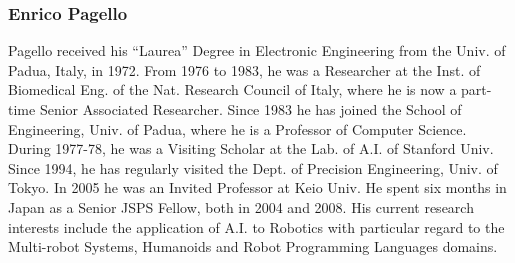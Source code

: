 \documentclass[conference]{IEEEtran}
\begin{document}
\subsubsection*{Enrico Pagello}
Pagello received his “Laurea” Degree in Electronic Engineering from the Univ. of Padua, Italy, in 1972. From 1976 to 1983, he was a Researcher at the Inst. of Biomedical Eng. of the Nat. Research Council of Italy, where he is now a part-time Senior Associated Researcher. Since 1983 he has joined the School of Engineering, Univ. of Padua, where he is a Professor of Computer Science. 
During 1977-78, he was a Visiting Scholar at the Lab. of A.I. of Stanford Univ. Since 1994, he has regularly visited the Dept. of Precision Engineering, Univ. of Tokyo. In 2005 he was an Invited Professor at Keio Univ. He spent six months in Japan as a Senior JSPS Fellow, both in 2004 and 2008. His current research interests include the application of A.I. to Robotics with particular regard to the Multi-robot Systems, Humanoids and Robot Programming Languages domains. 
\end{document}
